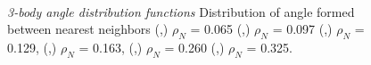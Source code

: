 \documentclass[12pt]{article}
\begin{document}
\begin{figure}[h!]
\begin{subfigure}[b]{0.15\textwidth}
    \vspace{-15pt} \caption{}
    \label{fig:ang_14_r}
  \end{subfigure}\\
	\caption{\textit{3-body angle distribution functions} Distribution of angle formed between nearest neighbors  (\protect{},\protect{})  \(\rho_N\) = 0.065 (\protect{},\protect{}) \(\rho_N\) = 0.097 (\protect{},\protect{}) \(\rho_N\) = 0.129, (\protect{},\protect{}) \(\rho_N\) = 0.163, (\protect{},\protect{}) \(\rho_N\) = 0.260 (\protect{},\protect{}) \(\rho_N\) = 0.325.}
	\label{fig:3body_angle_dist}
\end{figure}

\end{document}
